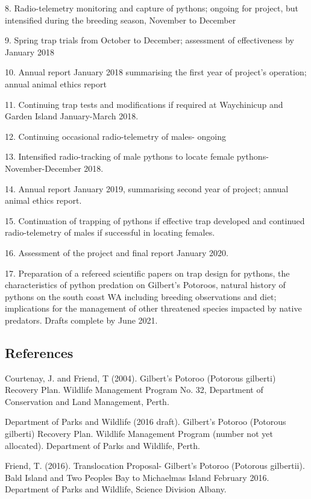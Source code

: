 \documentclass[version=last,
    paper=a4,                               %
    10pt,                                   %
    dvipsnames,
    oneside,                              %
    headings=openany,                       %
    open=any,
    BCOR=7mm,                               %
    DIV=15,     %
]{scrbook}
\begin{document}
8. Radio-telemetry monitoring and capture of pythons; ongoing for
project, but intensified during the breeding season, November to
December

9. Spring trap trials from October to December; assessment of
effectiveness by January 2018

10. Annual report January 2018 summarising the first year of project's
operation; annual animal ethics report

11. Continuing trap tests and modifications if required at Waychinicup
and Garden Island January-March 2018.

12. Continuing occasional radio-telemetry of males- ongoing

13. Intensified radio-tracking of male pythons to locate female pythons-
November-December 2018.

14. Annual report January 2019, summarising second year of project;
annual animal ethics report.

15. Continuation of trapping of pythons if effective trap developed and
continued radio-telemetry of males if successful in locating females.

16. Assessment of the project and final report January 2020.

17. Preparation of a refereed scientific papers on trap design for
pythons, the characteristics of python predation on Gilbert's Potoroos,
natural history of pythons on the south coast WA including breeding
observations and diet; implications for the management of other
threatened species impacted by native predators. Drafts complete by June
2021.




\subsection*{References}

Courtenay, J. and Friend, T (2004). Gilbert's Potoroo (Potorous
gilberti) Recovery Plan. Wildlife Management Program No. 32, Department
of Conservation and Land Management, Perth.

Department of Parks and Wildlife (2016 draft). Gilbert's Potoroo
(Potorous gilberti) Recovery Plan. Wildlife Management Program (number
not yet allocated). Department of Parks and Wildlife, Perth.

Friend, T. (2016). Translocation Proposal- Gilbert's Potoroo (Potorous
gilbertii). Bald Island and Two Peoples Bay to Michaelmas Island
February 2016. Department of Parks and Wildlife, Science Division
Albany.
\end{document}
